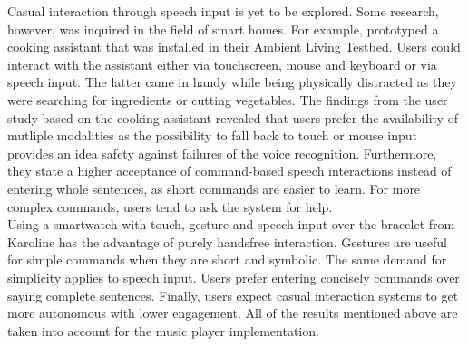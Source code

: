 Casual interaction through speech input is yet to be explored. Some research, however, was inquired in the field of smart homes. For example, \cite{blumendorf2008multimodal} prototyped a cooking assistant that was installed in their Ambient Living Testbed. Users could interact with the assistant either via touchscreen, mouse and keyboard or via speech input. The latter came in handy while being physically distracted as they were searching for ingredients or cutting vegetables. The findings from the user study based on the cooking assistant revealed that users prefer the availability of mutliple modalities as the possibility to fall back to touch or mouse input provides an idea safety against failures of the voice recognition. Furthermore, they state a higher acceptance of command-based speech interactions instead of entering whole sentences, as short commands are easier to learn. For more complex commands, users tend to ask the system for help.\\

Using a smartwatch with touch, gesture and speech input over the bracelet from Karoline \cite{Busse2014Thesis} has the advantage of purely handsfree interaction. Gestures are useful for simple commands when they are short and symbolic.  The same demand for simplicity applies to speech input. Users prefer entering concisely commands over saying complete sentences. Finally, users expect casual interaction systems to get more autonomous with lower engagement. All of the results mentioned above are taken into account for the music player implementation.







